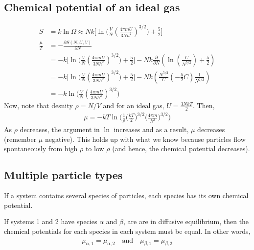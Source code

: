 \documentclass[11pt]{article}
\begin{document}
\subsection{Chemical potential of an ideal gas}
\begin{align*}
S &= k \ln \Omega \approx Nk \Bigg[\ln \big(\frac{V}{N}(\frac{4\pi m U}{3Nh^2})^{3/2}\big) + \frac{5}{2}\Bigg] \\
\frac{\mu}{T} &= -\frac{\partial S(N,U,V)}{\partial N} \\
&= -k \Bigg[\ln \big(\frac{V}{N}(\frac{4\pi m U}{3Nh^2})^{3/2}\big) + \frac{5}{2}\Bigg] -Nk \frac{\partial}{\partial N}(\ln(\frac{C}{N^{5/2}}) + \frac{5}{2}) \\
&= -k \Bigg[\ln \big(\frac{V}{N}(\frac{4\pi m U}{3Nh^2})^{3/2}\big) + \frac{5}{2}\Bigg] -Nk(\frac{N^{5/2}}{C} (-\frac{5}{2}C)\frac{1}{N^{7/2}}) \\
&= -k \ln \big(\frac{V}{N}(\frac{4\pi m U}{3Nh^2})^{3/2}\big)
\end{align*}
Now, note that desnity $\rho = N/V$ and for an ideal gas, $U = \frac{3NkT}{2}$. Then, 
\begin{align*}
    \mu = -kT\ln\Bigg(\frac{1}{\rho} \Big(\frac{kT}{2}\Big)^{3/2} \Big(\frac{4\pi m}{h^2}\Big)^{3/2} \Bigg) 
\end{align*}
As $\rho$ decreases, the argument in $\ln$ increases and as a result, $\mu$ decreases (remember $\mu$ negative). This holds up with what we know because particles flow spontaneously from high $\rho$ to low $\rho$ (and hence, the chemical potential decreases).


\subsection{Multiple particle types}
If a system contains several species of particles, each species has its own chemical potential. 

If systems 1 and 2 have species $\alpha$ and $\beta$, are are in diffusive equilibrium, then the chemical potentials for each species in each system must be equal. In other words, 
\begin{align*}
    \mu_{\alpha, 1} = \mu_{\alpha, 2} ~~~\text{ and }~~~ \mu_{\beta, 1} = \mu_{\beta, 2} 
\end{align*}
\end{document}
